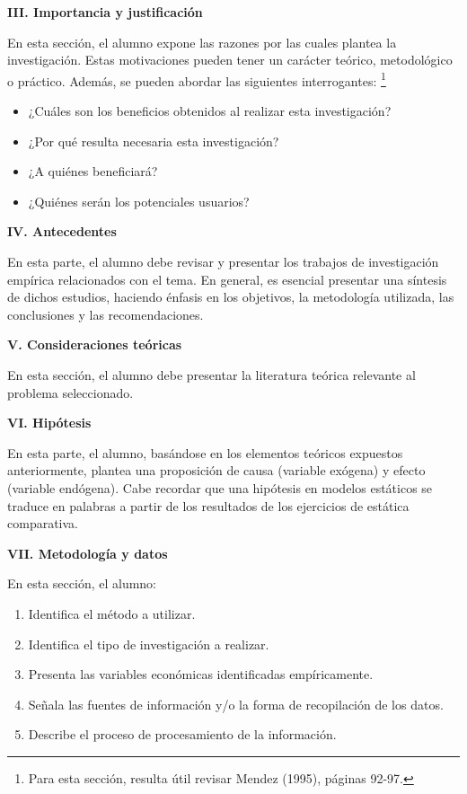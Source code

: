 \documentclass[
  letterpaper,
  DIV=11,
  numbers=noendperiod]{scrartcl}
\providecommand{\tightlist}{%
  \setlength{\itemsep}{0pt}\setlength{\parskip}{0pt}}\usepackage{longtable,booktabs,array}
\begin{document}
\textbf{III. Importancia y justificación}

En esta sección, el alumno expone las razones por las cuales plantea la
investigación. Estas motivaciones pueden tener un carácter teórico,
metodológico o práctico. Además, se pueden abordar las siguientes
interrogantes: \footnote{Para esta sección, resulta útil revisar Mendez
  (1995), páginas 92-97.}

\begin{itemize}
\tightlist
\item
  ¿Cuáles son los beneficios obtenidos al realizar esta investigación?
\item
  ¿Por qué resulta necesaria esta investigación?
\item
  ¿A quiénes beneficiará?
\item
  ¿Quiénes serán los potenciales usuarios?
\end{itemize}

\textbf{IV. Antecedentes}

En esta parte, el alumno debe revisar y presentar los trabajos de
investigación empírica relacionados con el tema. En general, es esencial
presentar una síntesis de dichos estudios, haciendo énfasis en los
objetivos, la metodología utilizada, las conclusiones y las
recomendaciones.

\textbf{V. Consideraciones teóricas}

En esta sección, el alumno debe presentar la literatura teórica
relevante al problema seleccionado.

\textbf{VI. Hipótesis}

En esta parte, el alumno, basándose en los elementos teóricos expuestos
anteriormente, plantea una proposición de causa (variable exógena) y
efecto (variable endógena). Cabe recordar que una hipótesis en modelos
estáticos se traduce en palabras a partir de los resultados de los
ejercicios de estática comparativa.

\textbf{VII. Metodología y datos}

En esta sección, el alumno:

\begin{enumerate}
\def\labelenumi{\arabic{enumi}.}
\tightlist
\item
  Identifica el método a utilizar.
\item
  Identifica el tipo de investigación a realizar.
\item
  Presenta las variables económicas identificadas empíricamente.
\item
  Señala las fuentes de información y/o la forma de recopilación de los
  datos.
\item
  Describe el proceso de procesamiento de la información.
\end{enumerate}
\end{document}
